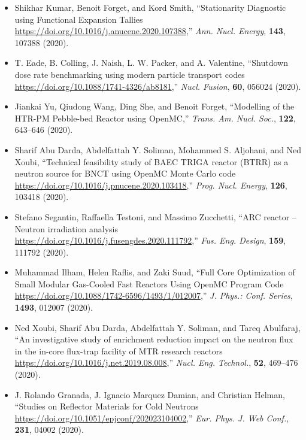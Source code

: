 \begin{itemize}

\item Shikhar Kumar, Benoit Forget, and Kord Smith, ``Stationarity Diagnostic using
Functional Expansion Tallies
\url{https://doi.org/10.1016/j.anucene.2020.107388},'' \textit{Ann. Nucl. Energy},
\textbf{143}, 107388 (2020).

\item T. Eade, B. Colling, J. Naish, L. W. Packer, and A. Valentine, ``Shutdown dose
rate benchmarking using modern particle transport codes
\url{https://doi.org/10.1088/1741-4326/ab8181},'' \textit{Nucl. Fusion}, \textbf{60}, 056024
(2020).

\item Jiankai Yu, Qiudong Wang, Ding She, and Benoit Forget, ``Modelling of the
HTR-PM Pebble-bed Reactor using OpenMC,'' \textit{Trans. Am. Nucl. Soc.}, \textbf{122},
643--646 (2020).

\item Sharif Abu Darda, Abdelfattah Y. Soliman, Mohammed S. Aljohani, and Ned Xoubi,
``Technical feasibility study of BAEC TRIGA reactor (BTRR) as a neutron source
for BNCT using OpenMC Monte Carlo code
\url{https://doi.org/10.1016/j.pnucene.2020.103418},'' \textit{Prog. Nucl. Energy},
\textbf{126}, 103418 (2020).

\item Stefano Segantin, Raffaella Testoni, and Massimo Zucchetti, ``ARC reactor --
Neutron irradiation analysis \url{https://doi.org/10.1016/j.fusengdes.2020.111792},''
\textit{Fus. Eng. Design}, \textbf{159}, 111792 (2020).

\item Muhammad Ilham, Helen Raflis, and Zaki Suud, ``Full Core Optimization of Small
Modular Gas-Cooled Fast Reactors Using OpenMC Program Code
\url{https://doi.org/10.1088/1742-6596/1493/1/012007},'' \textit{J. Phys.: Conf. Series},
\textbf{1493}, 012007 (2020).

\item Ned Xoubi, Sharif Abu Darda, Abdelfattah Y. Soliman, and Tareq Abulfaraj,
``An investigative study of enrichment reduction impact on the neutron flux in
the in-core flux-trap facility of MTR research reactors
\url{https://doi.org/10.1016/j.net.2019.08.008},'' \textit{Nucl. Eng. Technol.}, \textbf{52},
469--476 (2020).

\item J. Rolando Granada, J. Ignacio Marquez Damian, and Christian Helman, ``Studies
on Reflector Materials for Cold Neutrons
\url{https://doi.org/10.1051/epjconf/202023104002},'' \textit{Eur. Phys. J. Web Conf.},
\textbf{231}, 04002 (2020).


\end{itemize}
